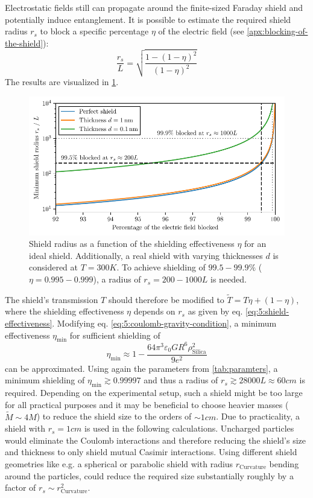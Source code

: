 Electrostatic fields still can propagate around the finite-sized Faraday shield and potentially induce entanglement.
It is possible to estimate the required shield radius $r_s$ to block a specific percentage $\eta$ of the electric field (see \cref{apx:blocking-of-the-shield}):
\begin{equation}\label{eq:5:shield-effectiveness}
  \frac{r_s}{L} = \sqrt{\frac{1-(1-\eta)^2}{(1-\eta)^2}}
\end{equation}
The results are visualized in \cref{fig:5:shield-radius}.
\begin{figure}[!ht]
  \centering
  \includegraphics[width=\textwidth]{./../figures/others/shield-radius.pdf}
  \caption{Shield radius as a function of the shielding effectiveness $\eta$ for an ideal shield. Additionally, a real shield with varying thicknesses $d$ is considered at $T=300\si{K}$.
  To achieve shielding of $99.5-99.9\%$ ($\eta = 0.995-0.999$), a radius of $r_s =200-1000L$ is needed.}
  \label{fig:5:shield-radius}
\end{figure}
The shield's transmission $T$ should therefore be modified to $\tilde{T} = T\eta + (1-\eta)$, where the shielding effectiveness $\eta$ depends on $r_s$ as given by eq. \eqref{eq:5:shield-effectiveness}.
Modifying eq. \eqref{eq:5:coulomb-gravity-condition}, a minimum effectiveness $\eta_\mathrm{min}$ for sufficient shielding of
\begin{equation}
  \eta_\mathrm{min} \approx 1 - \frac{64\pi^3 \varepsilon_0 G R^6 \rho^2_\mathrm{Silica}}{9 e^2}
\end{equation}
can be approximated.
Using again the parameters from \cref{tab:paramters}, a minimum shielding of $\eta_\mathrm{min} \gtrsim 0.99997$ and thus a radius of $r_s \gtrsim 28000 L \approx 60\si{cm}$ is required.
Depending on the experimental setup, such a shield might be too large for all practical purposes and it may be beneficial to choose heavier masses ($\tilde{M} \sim 4 M$) to reduce the shield size to the orders of $\sim 1\si{cm}$.
Due to practicality, a shield with $r_s = 1\si{cm}$ is used in the following calculations.
Uncharged particles would eliminate the Coulomb interactions and therefore reducing the shield's size and thickness to only shield mutual Casimir interactions.
Using different shield geometries like e.g. a spherical or parabolic shield with radius $r_\mathrm{Curvature}$ bending around the particles, could reduce the required size substantially roughly by a factor of $r_s \sim r_\mathrm{Curvature}^2$. 




